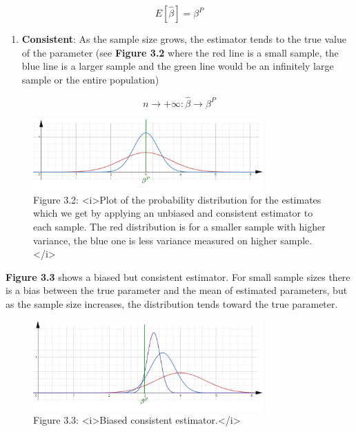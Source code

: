\[E[\hat \beta] = \beta^P\]

\begin{enumerate}
    \item \textbf{Consistent}: As the sample size grows, the estimator tends to the true value of the parameter (see \textbf{Figure 3.2} where the red line is a small sample, the blue line is a larger sample and the green line would be an infinitely large sample or the entire population)
\end{enumerate}

\[n \to +\infty: \hat \beta \to \beta^P \]


\begin{figure}[htbp]
    \begin{center}
        \includegraphics[width=250pt]{../img/03-estimate-distribution.png}
        \caption{Figure 3.2: <i>Plot of the probability distribution for the estimates which we get by applying an unbiased and consistent estimator to each sample. The red distribution is for a smaller sample with higher variance, the blue one is less variance measured on higher sample.</i>}
    \end{center}
\end{figure}


\textbf{Figure 3.3} shows a biased but consistent estimator. For small sample sizes there is a bias between the true parameter and the mean of estimated parameters, but as the sample size increases, the distribution tends toward the true parameter.



\begin{figure}[htbp]
    \begin{center}
        \includegraphics[width=250pt]{../img/03-biased-consistent-estimator.png}
        \caption{Figure 3.3: <i>Biased consistent estimator.</i>}
    \end{center}
\end{figure}



